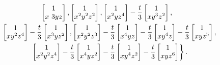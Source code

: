 \documentclass[10pt,a4paper]{amsart}
\numberwithin{equation}{section}
\begin{document}
\begin{Example}
\begin{gather*}
\begin{bmatrix} 1 \\ x~3 y z \end{bmatrix},
\begin{bmatrix} 1 \\ x^{2} y^{2} z^{2}\end{bmatrix},
\begin{bmatrix} 1 \\ x^{2} y z^{4}\end{bmatrix}-\dfrac{t}{3}
\begin{bmatrix} 1 \\ x y^{3} z^{2}\end{bmatrix},
\\
\hphantom{\left\{\right.}
\begin{bmatrix} 1 \\ x y^{2} z^{4}\end{bmatrix} -\dfrac{t}{3}
\begin{bmatrix} 1 \\ x^{3} y z^{2}\end{bmatrix},
\begin{bmatrix} 1 \\ x^{2} y^{2} z^{3}\end{bmatrix} -\dfrac{t}{3}
\begin{bmatrix} 1 \\ x^{4} y z\end{bmatrix} -\dfrac{t}{3}
\begin{bmatrix} 1 \\ x y^{4} z\end{bmatrix} -\dfrac{t}{3}
\begin{bmatrix} 1 \\ x y z^{5}\end{bmatrix},
\\
\hphantom{\left\{\right.}
\left.
\begin{bmatrix} 1 \\ x^{2} y^{2} z^{4}\end{bmatrix} -\dfrac{t}{3}
\begin{bmatrix} 1 \\ x^{4} y z^{2} \end{bmatrix} -\dfrac{t}{3}
\begin{bmatrix} 1 \\ x y^{4} z^{2}\end{bmatrix}-\dfrac{t}{3}
\begin{bmatrix} 1 \\ x y z^{6}\end{bmatrix}\right\}.
\end{gather*}


\end{Example}
\end{document}
